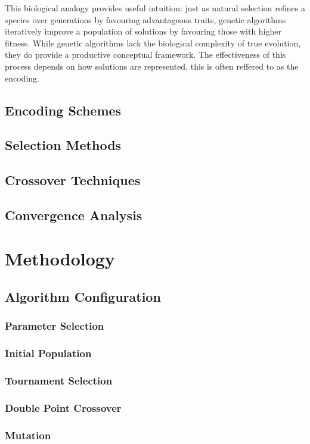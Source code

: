 This biological analogy provides useful intuition: just as natural selection refines a species over generations by favouring advantageous traits, genetic algorithms iteratively improve a population of solutions by favouring those with higher fitness. While genetic algorithms lack the biological complexity of true evolution, they do provide a productive conceptual framework. The effectiveness of this process depends on how solutions are represented, this is often reffered to as the encoding.
\subsection{Encoding Schemes}
\subsection{Selection Methods}
\subsection{Crossover Techniques}
\subsection{Convergence Analysis}



\section{Methodology}
\subsection{Algorithm Configuration}
\subsubsection{Parameter Selection}
\subsubsection{Initial Population}
\subsubsection{Tournament Selection}
\subsubsection{Double Point Crossover}
\subsubsection{Mutation}
